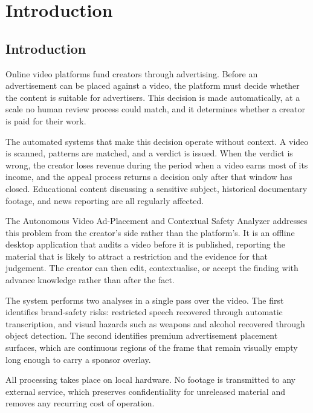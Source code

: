 \documentclass[12pt,a4paper,twoside]{report}
\begin{document}
\tableofcontents
\listoffigures
\listoftables
\newpage

\chapter{Introduction}

\section{Introduction}

Online video platforms fund creators through advertising. Before an advertisement can be placed against a video, the platform must decide whether the content is suitable for advertisers. This decision is made automatically, at a scale no human review process could match, and it determines whether a creator is paid for their work.

The automated systems that make this decision operate without context. A video is scanned, patterns are matched, and a verdict is issued. When the verdict is wrong, the creator loses revenue during the period when a video earns most of its income, and the appeal process returns a decision only after that window has closed. Educational content discussing a sensitive subject, historical documentary footage, and news reporting are all regularly affected.

The Autonomous Video Ad-Placement and Contextual Safety Analyzer addresses this problem from the creator's side rather than the platform's. It is an offline desktop application that audits a video before it is published, reporting the material that is likely to attract a restriction and the evidence for that judgement. The creator can then edit, contextualise, or accept the finding with advance knowledge rather than after the fact.

The system performs two analyses in a single pass over the video. The first identifies brand-safety risks: restricted speech recovered through automatic transcription, and visual hazards such as weapons and alcohol recovered through object detection. The second identifies premium advertisement placement surfaces, which are continuous regions of the frame that remain visually empty long enough to carry a sponsor overlay.

All processing takes place on local hardware. No footage is transmitted to any external service, which preserves confidentiality for unreleased material and removes any recurring cost of operation.
\end{document}
